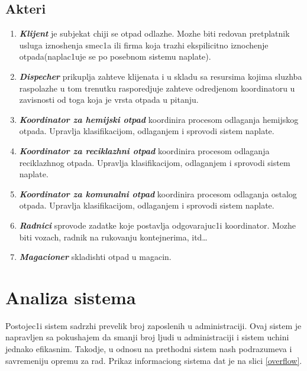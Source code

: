 \documentclass[10 pt]{article}
\begin{document}
\subsection{Akteri}
	\begin{enumerate}
		\item
			\textit{\textbf{Klijent}} je subjekat chiji se otpad odlazhe. Mozhe biti redovan pretplatnik usluga iznoshenja smec1a ili firma koja trazhi ekspilicitno iznochenje otpada(naplac1uje se po posebnom sistemu naplate).
		\item 
			\textit{\textbf{Dispecher}} prikuplja zahteve klijenata i u skladu sa resursima kojima sluzhba raspolazhe u tom trenutku rasporedjuje zahteve odredjenom koordinatoru u zavisnosti od toga koja je vrsta otpada u pitanju.
		\item 
			\textit{\textbf{Koordinator za hemijski otpad}} koordinira procesom odlaganja hemijskog otpada. Upravlja klasifikacijom, odlaganjem i sprovodi sistem naplate.
		\item 
			\textit{\textbf{Koordinator za reciklazhni otpad}} koordinira procesom odlaganja reciklazhnog otpada. Upravlja klasifikacijom, odlaganjem i sprovodi sistem naplate.
		\item 
			\textit{\textbf{Koordinator za komunalni otpad}} koordinira procesom odlaganja ostalog otpada. Upravlja klasifikacijom, odlaganjem i sprovodi sistem naplate. 	
		\item 
			\textit{\textbf{Radnici}} sprovode zadatke koje postavlja odgovarajuc1i koordinator. Mozhe biti vozach, radnik na rukovanju kontejnerima, itd…
		\item 
			\textit{\textbf{Magacioner}} skladishti otpad u magacin. 
	\end{enumerate}


\section{Analiza sistema}
\setlength{\parindent}{30pt} Postojec1i sistem sadrzhi prevelik broj zaposlenih u administraciji. Ovaj sistem je napravljen sa pokushajem da smanji broj ljudi u administraciji i sistem uchini jednako efikasnim. Takodje, u odnosu na prethodni sistem nash podrazumeva i savremeniju opremu za rad. Prikaz informaciong sistema dat je na slici \ref{overflow}. 
\end{document}
